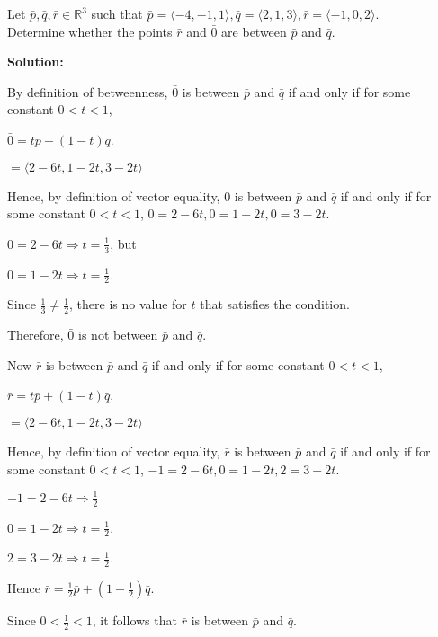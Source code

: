 \begin{examplebox}


  Let $\bar{p}, \bar{q}, \bar{r} \in \mathbb{R}^3$ such that 
  $\bar{p} = \langle -4, -1, 1 \rangle, \bar{q} = \langle 2,1,3 \rangle, \bar{r} = \langle-1,0,2 \rangle$.\\
  Determine whether the points $\bar{r}$ and $\bar{0}$ are between $\bar{p}$ and $\bar{q}$.

  \vspace{1em}

  \textbf{Solution:}

  \vspace{1em}

  By definition of betweenness, $\bar{0}$ is between $\bar{p}$ and $\bar{q}$ if and only if for some constant $0 < t < 1$,

  $\bar{0} = t\bar{p} + (1 - t)\bar{q}$.

  \quad $= \langle 2-6t, 1-2t, 3-2t \rangle$

  \vspace{0.5em}

  Hence, by definition of vector equality, $\bar{0}$ is between $\bar{p}$ and $\bar{q}$ if and only if for some constant $0 < t < 1$,
  $0 = 2-6t, 0 = 1-2t, 0= 3-2t$.

  \quad $0 = 2-6t \Rightarrow t = \frac{1}{3}$, but

  \quad $0 = 1-2t \Rightarrow t = \frac{1}{2}$.

  Since $\frac{1}{3} \neq \frac{1}{2}$, there is no value for $t$ that satisfies the condition.

  Therefore, $\bar{0}$ is not between $\bar{p}$ and $\bar{q}$.

  Now $\bar{r}$ is between $\bar{p}$ and $\bar{q}$ if and only if for some constant $0 < t < 1$,

  $\bar{r} = t\bar{p} + (1 - t)\bar{q}$.

  \quad $= \langle 2-6t, 1-2t, 3-2t \rangle$

  \vspace{0.5em}

  Hence, by definition of vector equality, $\bar{r}$ is between $\bar{p}$ and $\bar{q}$ if and only if for some constant $0 < t < 1$, 
  $-1 = 2-6t, 0 = 1-2t, 2 = 3-2t$.

  \quad $-1 = 2-6t \Rightarrow \frac{1}{2}$
 
  \quad $0 = 1-2t \Rightarrow t = \frac{1}{2}$.

 \quad  $2 = 3-2t \Rightarrow t = \frac{1}{2}$.

  Hence $\bar{r} = \frac{1}{2}\bar{p} + (1 - \frac{1}{2})\bar{q}$.

  Since $0 < \frac{1}{2} < 1$, it follows that $\bar{r}$ is between $\bar{p}$ and $\bar{q}$.

\end{examplebox}


